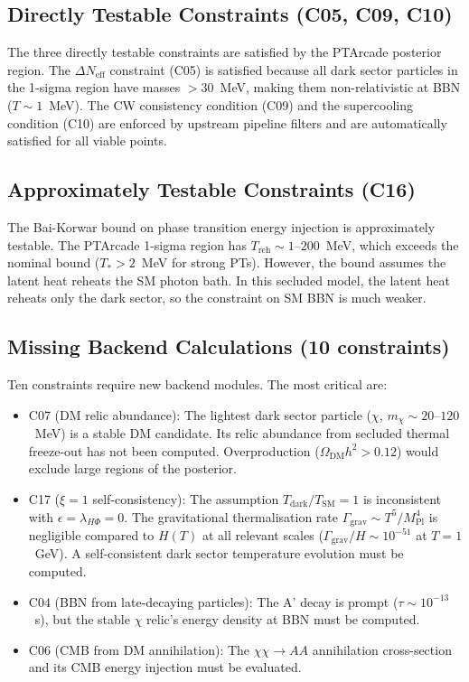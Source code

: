 \documentclass[12pt,a4paper]{article}
\begin{document}
\subsection{Directly Testable Constraints (C05, C09, C10)}

The three directly testable constraints are satisfied by the PTArcade posterior region. The $\Delta N_{\text{eff}}$ constraint (C05) is satisfied because all dark sector particles in the 1-sigma region have masses $> 30$~MeV, making them non-relativistic at BBN ($T \sim 1$~MeV). The CW consistency condition (C09) and the supercooling condition (C10) are enforced by upstream pipeline filters and are automatically satisfied for all viable points.

\subsection{Approximately Testable Constraints (C16)}

The Bai-Korwar bound on phase transition energy injection is approximately testable. The PTArcade 1-sigma region has $T_\text{reh} \sim 1$--$200$~MeV, which exceeds the nominal bound ($T_* > 2$~MeV for strong PTs). However, the bound assumes the latent heat reheats the SM photon bath. In this secluded model, the latent heat reheats only the dark sector, so the constraint on SM BBN is much weaker.

\subsection{Missing Backend Calculations (10 constraints)}

Ten constraints require new backend modules. The most critical are:
\begin{itemize}
\item C07 (DM relic abundance): The lightest dark sector particle ($\chi$, $m_\chi \sim 20$--$120$~MeV) is a stable DM candidate. Its relic abundance from secluded thermal freeze-out has not been computed. Overproduction ($\Omega_\text{DM}h^2 > 0.12$) would exclude large regions of the posterior.
\item C17 ($\xi = 1$ self-consistency): The assumption $T_\text{dark}/T_\text{SM} = 1$ is inconsistent with $\epsilon = \lambda_{H\Phi} = 0$. The gravitational thermalisation rate $\Gamma_\text{grav} \sim T^5/M_\text{Pl}^4$ is negligible compared to $H(T)$ at all relevant scales ($\Gamma_\text{grav}/H \sim 10^{-51}$ at $T = 1$~GeV). A self-consistent dark sector temperature evolution must be computed.
\item C04 (BBN from late-decaying particles): The A' decay is prompt ($\tau \sim 10^{-13}$~s), but the stable $\chi$ relic's energy density at BBN must be computed.
\item C06 (CMB from DM annihilation): The $\chi \chi \to AA$ annihilation cross-section and its CMB energy injection must be evaluated.
\end{itemize}
\end{document}
